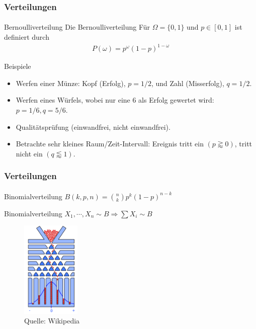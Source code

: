 \documentclass{beamer}
\begin{document}
\begin{frame}
    \frametitle{Verteilungen}
\framesubtitle{}

\begin{block}{Bernoulliverteilung}
Die Bernoulliverteilung  Für $\Omega = \{ 0, 1\}$ und $p \in [0,1]$ ist definiert durch
\begin{align*}
P (\omega) = p^{\omega} (1-p)^{1 -\omega}
\end{align*}
\end{block}

\begin{block}{Beispiele}

\begin{itemize}
\item Werfen einer Münze: Kopf (Erfolg), $p=1/2$, und Zahl (Misserfolg), $q=1/2$.
\item Werfen eines Würfels, wobei nur eine 6 als Erfolg gewertet wird: $p=1/6, q=5/6$.
\item Qualitätsprüfung (einwandfrei, nicht einwandfrei).
\item Betrachte sehr kleines Raum/Zeit-Intervall: Ereignis tritt ein $(p \gtrapprox 0)$, tritt nicht ein $(q\lessapprox 1)$.
\end{itemize}

\end{block}
 \end{frame}




\begin{frame}
    \frametitle{ Verteilungen}
\framesubtitle{}

\begin{block}{Binomialverteilung}
$B(k,  p,n)= \binom nk p^k (1-p)^{n-k} $
\end{block}
\begin{block}{Binomialverteilung}
$X_1, \cdots ,X_n \sim B \Rightarrow \sum X_i  \sim B$
\end{block}

\begin{figure}[htp]
      \centering
    \includegraphics[width=0.25\textwidth]{img/Galton}
      \caption{Quelle: Wikipedia}
\end{figure}
 \end{frame}
\end{document}
